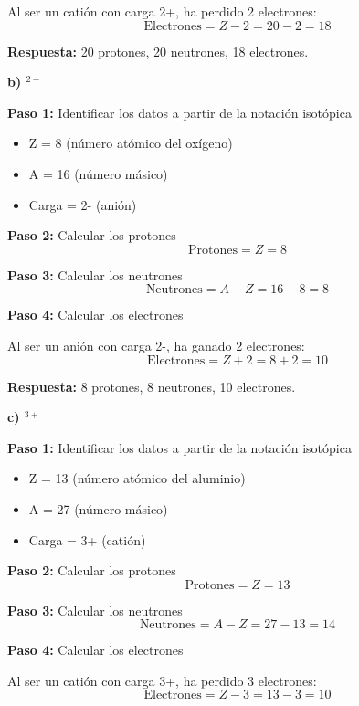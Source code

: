 \begin{exercise}
\begin{solu}
        Al ser un catión con carga 2+, ha perdido 2 electrones:
        \[
            \text{Electrones} = Z - 2 = 20 - 2 = 18
        \]

        \textbf{Respuesta:} 20 protones, 20 neutrones, 18 electrones.

        \textbf{b) $^{2-}$}

        \textbf{Paso 1:} Identificar los datos a partir de la notación isotópica
        \begin{itemize}
            \item Z = 8 (número atómico del oxígeno)
            \item A = 16 (número másico)
            \item Carga = 2- (anión)
        \end{itemize}

        \textbf{Paso 2:} Calcular los protones
        \[
            \text{Protones} = Z = 8
        \]

        \textbf{Paso 3:} Calcular los neutrones
        \[
            \text{Neutrones} = A - Z = 16 - 8 = 8
        \]

        \textbf{Paso 4:} Calcular los electrones

        Al ser un anión con carga 2-, ha ganado 2 electrones:
        \[
            \text{Electrones} = Z + 2 = 8 + 2 = 10
        \]

        \textbf{Respuesta:} 8 protones, 8 neutrones, 10 electrones.

        \textbf{c) $^{3+}$}

        \textbf{Paso 1:} Identificar los datos a partir de la notación isotópica
        \begin{itemize}
            \item Z = 13 (número atómico del aluminio)
            \item A = 27 (número másico)
            \item Carga = 3+ (catión)
        \end{itemize}

        \textbf{Paso 2:} Calcular los protones
        \[
            \text{Protones} = Z = 13
        \]

        \textbf{Paso 3:} Calcular los neutrones
        \[
            \text{Neutrones} = A - Z = 27 - 13 = 14
        \]

        \textbf{Paso 4:} Calcular los electrones

        Al ser un catión con carga 3+, ha perdido 3 electrones:
        \[
            \text{Electrones} = Z - 3 = 13 - 3 = 10
        \]


\end{solu}
\end{exercise}
